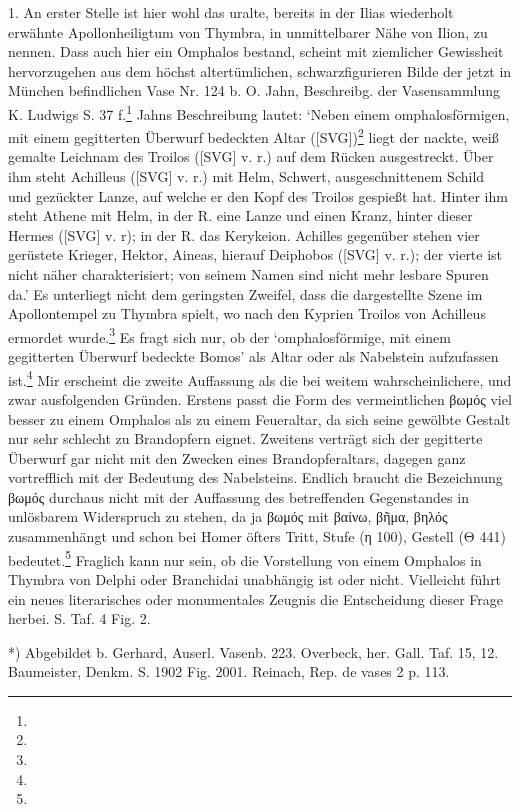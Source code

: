 \documentclass[a4paper, 11pt, oneside]{article}
\begin{document}
1. An erster Stelle ist hier wohl das uralte, bereits in der Ilias wiederholt erwähnte Apollonheiligtum von Thymbra, in unmittelbarer Nähe von Ilion, zu nennen. Dass auch hier ein Omphalos bestand, scheint mit ziemlicher Gewissheit hervorzugehen aus dem höchst altertümlichen, schwarzfigurieren Bilde der jetzt in München befindlichen Vase Nr. 124 b. O. Jahn, Beschreibg. der Vasensammlung K. Ludwigs S. 37 f.\footnote{} Jahns Beschreibung lautet: `Neben einem omphalosförmigen, mit einem gegitterten Überwurf bedeckten Altar ([SVG])\footnote{} liegt der nackte, weiß gemalte Leichnam des Troilos ([SVG] v. r.) auf dem Rücken ausgestreckt. Über ihm steht Achilleus ([SVG] v. r.) mit Helm, Schwert, ausgeschnittenem Schild und gezückter Lanze, auf welche er den Kopf des Troilos gespießt hat. Hinter ihm steht Athene mit Helm, in der R. eine Lanze und einen Kranz, hinter dieser Hermes ([SVG] v. r); in der R. das Kerykeion. Achilles gegenüber stehen vier gerüstete Krieger, Hektor, Aineas, hierauf Deiphobos ([SVG] v. r.); der vierte ist nicht näher charakterisiert; von seinem Namen sind nicht mehr lesbare Spuren da.' Es unterliegt nicht dem geringsten Zweifel, dass die dargestellte Szene im Apollontempel zu Thymbra spielt, wo nach den Kyprien Troilos von Achilleus ermordet wurde.\footnote{} Es fragt sich nur, ob der `omphalosförmige, mit einem gegitterten Überwurf bedeckte Bomos' als Altar oder als Nabelstein aufzufassen ist.\footnote{} Mir erscheint die zweite Auffassung als die bei weitem wahrscheinlichere, und zwar ausfolgenden Gründen. Erstens passt die Form des vermeintlichen βωμός viel besser zu einem Omphalos als zu einem Feueraltar, da sich seine gewölbte Gestalt nur sehr schlecht zu Brandopfern eignet. Zweitens verträgt sich der gegitterte Überwurf gar nicht mit den Zwecken eines Brandopferaltars, dagegen ganz vortrefflich mit der Bedeutung des Nabelsteins. Endlich braucht die Bezeichnung βωμός durchaus nicht mit der Auffassung des betreffenden Gegenstandes in unlösbarem Widerspruch zu stehen, da ja βωμός mit βαίνω, βῆμα, βηλός zusammenhängt und schon bei Homer öfters Tritt, Stufe (η 100), Gestell (Θ 441) bedeutet.\footnote{} Fraglich kann nur sein, ob die Vorstellung von einem Omphalos in Thymbra von Delphi oder Branchidai unabhängig ist oder nicht. Vielleicht führt ein neues literarisches oder monumentales Zeugnis die Entscheidung dieser Frage herbei. S. Taf. 4 Fig. 2.

*) Abgebildet b. Gerhard, Auserl. Vasenb. 223. Overbeck, her. Gall. Taf. 15, 12. Baumeister, Denkm. S. 1902 Fig. 2001. Reinach, Rep. de vases 2 p. 113.
\end{document}
